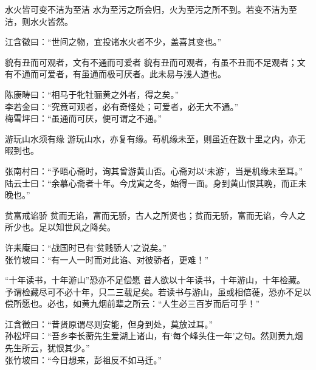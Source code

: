 \begin{yulu}{水火皆可变不洁为至洁}
水为至污之所会归，火为至污之所不到。若变不洁为至洁，则水火皆然。
\begin{comments}
江含徵曰：“世间之物，宜投诸水火者不少，盖喜其变也。”
\end{comments}
\end{yulu}

\begin{yulu}{貌有丑而可观者，文有不通而可爱者}
貌有丑而可观者，有虽不丑而不足观者；文有不通而可爱者，有虽通而极可厌者。此未易与浅人道也。
\begin{comments}
陈康畴曰：“相马于牝牡骊黄之外者，得之矣。” \\
李若金曰：“究竟可观者，必有奇怪处；可爱者，必无大不通。” \\
梅雪坪曰：“虽通而可厌，便可谓之不通。”
\end{comments}
\end{yulu}

\begin{yulu}{游玩山水须有缘}
游玩山水，亦复有缘。苟机缘未至，则虽近在数十里之内，亦无暇到也。
\begin{comments}
张南村曰：“予晤心斋时，询其曾游黄山否。心斋对以‘未游’，当是机缘未至耳。” \\
陆云士曰：“余慕心斋者十年。今戊寅之冬，始得一面。身到黄山恨其晚，而正未晚也。”
\end{comments}
\end{yulu}

\begin{yulu}{贫富戒谄骄}
贫而无谄，富而无骄，古人之所贤也；贫而无骄，富而无谄，今人之所少也。足以知世风之降矣。
\begin{comments}
许耒庵曰：“战国时已有‘贫贱骄人’之说矣。” \\
张竹坡曰：“有一人一时而对此谄、对彼骄者，更难！”
\end{comments}
\end{yulu}

\begin{yulu}{“十年读书，十年游山”恐亦不足偿愿}
昔人欲以十年读书，十年游山，十年检藏。予谓检藏尽可不必十年，只二三载足矣。若读书与游山，虽或相倍蓰，恐亦不足以偿所愿也。必也，如黄九烟前辈之所云：“人生必三百岁而后可乎！”
\begin{comments}
江含徵曰：“昔贤原谓尽则安能，但身到处，莫放过耳。” \\
孙松坪曰：“吾乡李长蘅先生爱湖上诸山，有‘每个峰头住一年’之句。然则黄九烟先生所云，犹恨其少。” \\
张竹坡曰：“今日想来，彭祖反不如马迁。”
\end{comments}
\end{yulu}

